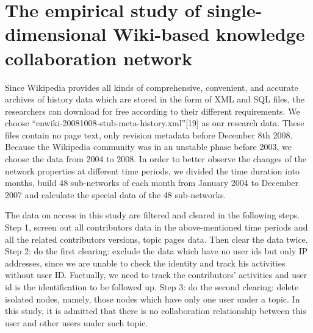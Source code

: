 \documentclass{elsarticle}
\begin{document}
\section{The empirical study of single-dimensional Wiki-based knowledge collaboration network}
\label{sec:empir-study-single}

Since Wikipedia provides all kinds of comprehensive, convenient, and
accurate archives of history data which are stored in the form of
XML and SQL files, the researchers can download for free according
to their different requirements. We choose
“enwiki-20081008-stub-meta-history.xml”[19] as our research
data. These files contain no page text, only revision metadata before
December 8th 2008. Because the Wikipedia community was in an unstable
phase before 2003, we choose the data from 2004 to 2008. In order to
better observe the changes of the network  properties at different time periods, we divided the time duration into months, build 48 sub-networks of each month from January 2004 to December 2007 and calculate the special data of the 48 sub-networks.

The data on access in this study are filtered and cleared in the following steps. Step 1, screen out all contributors data in the above-mentioned time periods and all the related contributors versions, topic pages data. Then clear the data twice. Step 2: do the first clearing: exclude the data which have no user ids but only IP addresses, since we are unable to check the identity and track his activities without user ID. Factually, we need to track the contributors’ activities and user id is the identification to be followed up. Step 3: do the second clearing: delete isolated nodes, namely, those nodes which have only one user under a topic. In this study, it is admitted that there is no collaboration relationship between this user and other users under such topic.
\end{document}

